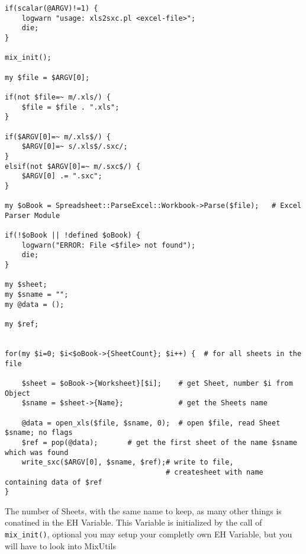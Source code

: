 \documentclass[a4paper,12pt]{article}
\begin{document}
\begin{verbatim}
if(scalar(@ARGV)!=1) {
    logwarn "usage: xls2sxc.pl <excel-file>";
    die;
}

mix_init();

my $file = $ARGV[0];

if(not $file=~ m/.xls/) {
    $file = $file . ".xls";
}

if($ARGV[0]=~ m/.xls$/) {
    $ARGV[0]=~ s/.xls$/.sxc/;
} 
elsif(not $ARGV[0]=~ m/.sxc$/) { 
    $ARGV[0] .= ".sxc";
}

my $oBook = Spreadsheet::ParseExcel::Workbook->Parse($file);   # Excel Parser Module

if(!$oBook || !defined $oBook) {
    logwarn("ERROR: File <$file> not found");
    die;
}

my $sheet;
my $sname = "";
my @data = ();

my $ref;


for(my $i=0; $i<$oBook->{SheetCount}; $i++) {  # for all sheets in the file

    $sheet = $oBook->{Worksheet}[$i];    # get Sheet, number $i from Object
    $sname = $sheet->{Name};             # get the Sheets name

    @data = open_xls($file, $sname, 0);  # open $file, read Sheet $sname; no flags
    $ref = pop(@data);       # get the first sheet of the name $sname which was found
    write_sxc($ARGV[0], $sname, $ref);# write to file,
                                      # createsheet with name containing data of $ref 
}

\end{verbatim}
The number of Sheets, with the same name to keep, as many other things is conatined in the EH Variable. This Variable is initialized by the call of {\tt mix\_init()}, optional you may setup your completly own EH Variable, but you will have to look into MixUtils%
\end{document}

